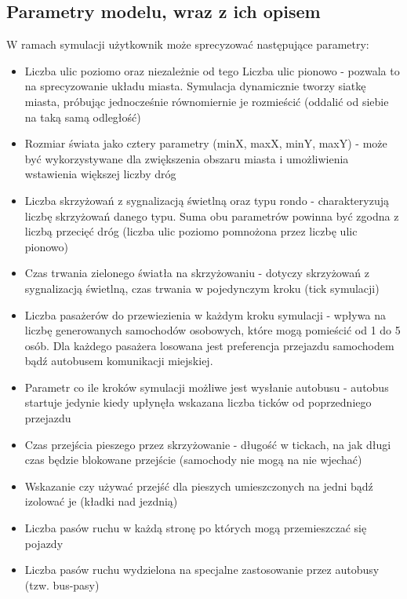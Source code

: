 \documentclass{article}
\begin{document}
\subsection{Parametry modelu, wraz z ich opisem}
\label{subsection:parametry}
W ramach symulacji użytkownik może sprecyzować następujące parametry:
\begin{itemize}
    \item Liczba ulic poziomo oraz niezależnie od tego Liczba ulic pionowo - pozwala to na sprecyzowanie układu miasta. Symulacja dynamicznie tworzy siatkę miasta, próbując jednocześnie równomiernie je rozmieścić (oddalić od siebie na taką samą odległość)
    \item Rozmiar świata jako cztery parametry (minX, maxX, minY, maxY) - może być wykorzystywane dla zwiększenia obszaru miasta i umożliwienia wstawienia większej liczby dróg
    \item Liczba skrzyżowań z sygnalizacją świetlną oraz typu rondo - charakteryzują liczbę skrzyżowań danego typu. Suma obu parametrów powinna być zgodna z liczbą przecięć dróg (liczba ulic poziomo pomnożona przez liczbę ulic pionowo)
    \item Czas trwania zielonego światła na skrzyżowaniu - dotyczy skrzyżowań z sygnalizacją świetlną, czas trwania w pojedynczym kroku (tick symulacji)
    \item Liczba pasażerów do przewiezienia w każdym kroku symulacji - wpływa na liczbę generowanych samochodów osobowych, które mogą pomieścić od 1 do 5 osób. Dla każdego pasażera losowana jest preferencja przejazdu samochodem bądź autobusem komunikacji miejskiej.
    \item Parametr co ile kroków symulacji możliwe jest wysłanie autobusu - autobus startuje jedynie kiedy upłynęła wskazana liczba ticków od poprzedniego przejazdu
    \item Czas przejścia pieszego przez skrzyżowanie - długość w tickach, na jak długi czas będzie blokowane przejście (samochody nie mogą na nie wjechać)
    \item Wskazanie czy używać przejść dla pieszych umieszczonych na jedni bądź izolować je (kładki nad jezdnią)
    \item Liczba pasów ruchu w każdą stronę po których mogą przemieszczać się pojazdy
    \item Liczba pasów ruchu wydzielona na specjalne zastosowanie przez autobusy (tzw. bus-pasy)
\end{itemize}
\end{document}
